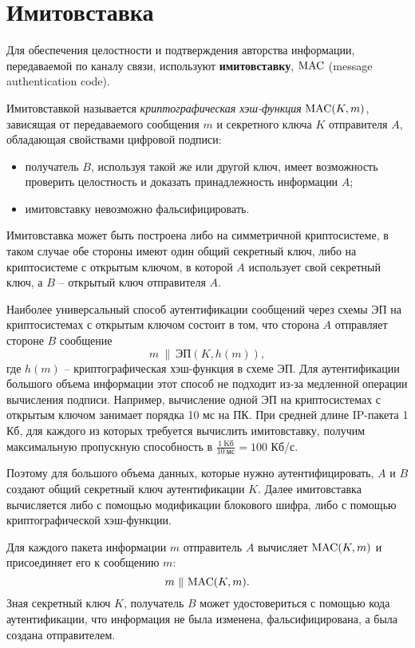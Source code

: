 \section{Имитовставка}

Для обеспечения целостности и подтверждения авторства информации, передаваемой по каналу связи, используют \textbf{имитовставку}, $\textrm{MAC}$ (message authentication code).

Имитовставкой называется \emph{криптографическая хэш-функция} $\textrm{MAC}(K,m)$, зависящая от передаваемого сообщения $m$ и секретного ключа $K$ отправителя $A$, обладающая свойствами цифровой подписи:
\begin{itemize}
    \item получатель $B$, используя такой же или другой ключ, имеет возможность проверить целостность и доказать принадлежность информации $A$;
    \item имитовставку невозможно фальсифицировать.
\end{itemize}

Имитовставка может быть построена либо на симметричной криптосистеме, в таком случае обе стороны имеют один общий секретный ключ, либо на криптосистеме с открытым ключом, в которой $A$ использует свой секретный ключ, а $B$ -- открытый ключ отправителя $A$.

Наиболее универсальный способ аутентификации сообщений через схемы ЭП на криптосистемах с открытым ключом состоит в том, что сторона $A$ отправляет стороне $B$ сообщение
    \[ m ~\|~ \textrm{ЭП}(K, h(m)), \]
где $h(m)$ -- криптографическая хэш-функция в схеме ЭП.  Для аутентификации большого объема информации этот способ не подходит из-за медленной операции вычисления подписи. Например, вычисление одной ЭП на криптосистемах с открытым ключом занимает порядка 10 мс на ПК. При средней длине IP-пакета 1 Кб, для каждого из которых требуется вычислить имитовставку, получим максимальную пропускную способность в $\frac{1 ~ \text{Kб}}{10 ~ \text{мс}} = 100$ Кб/с.

Поэтому для большого объема данных, которые нужно аутентифицировать, $A$ и $B$ создают общий секретный ключ аутентификации $K$. Далее имитовставка вычисляется либо с помощью модификации блокового шифра, либо с помощью криптографической хэш-функции.

Для каждого пакета информации $m$ отправитель $A$ вычисляет $\textrm{MAC}(K,m)$ и присоединяет его к сообщению $m$:
    \[ m ~ \|~ \textrm{MAC}(K,m). \]
Зная секретный ключ $K$, получатель $B$ может удостовериться с помощью кода аутентификации, что информация не была изменена, фальсифицирована, а была создана отправителем.

